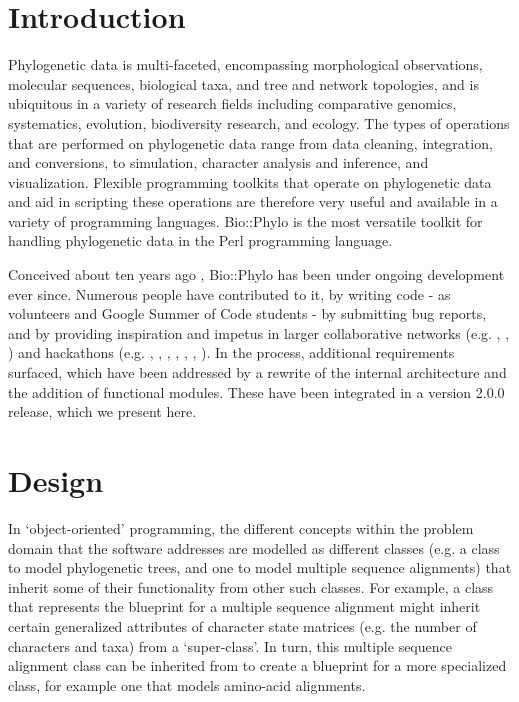\documentclass{bioinfo}
\begin{document}
\section{Introduction}

Phylogenetic data is multi-faceted, encompassing morphological observations, molecular 
sequences, biological taxa, and tree and network topologies, and is ubiquitous in a 
variety of research fields including comparative genomics, systematics, evolution, 
biodiversity research, and ecology. The types of operations that are performed on 
phylogenetic data range from data cleaning, integration, and conversions, to simulation,
character analysis and inference, and visualization. Flexible programming toolkits that
operate on phylogenetic data and aid in scripting these operations are therefore very 
useful and available in a variety of programming languages. Bio::Phylo \citep{Vos2011} is 
the most versatile toolkit for handling phylogenetic data in the Perl programming
language.

Conceived about ten years ago \citep{Vos2006,Vos2017}, Bio::Phylo has been under
ongoing development ever since. Numerous people have contributed to it, by writing code 
- as volunteers and Google Summer of Code students - by submitting bug reports, and by 
providing inspiration and impetus in larger collaborative networks (e.g. 
\citet{Stoltzfus2010}, \citet{Koureas2016}, \citet{Koureas2016a}) and hackathons (e.g. 
\citet{Lapp2007}, \citet{Katayama2010}, \citet{Katayama2011}, \citet{Katayama2013}, 
\citet{Stoltzfus2013}, \citet{Katayama2014}, \citet{Vos2014}). In the process, additional
requirements surfaced, which have been addressed by a rewrite of the internal architecture
and the addition of functional modules. These have been integrated in a version 2.0.0
release, which we present here.

\section{Design}

In `object-oriented' programming, the different concepts within the problem domain that
the software addresses are modelled as different classes (e.g. a class to model 
phylogenetic trees, and one to model multiple sequence alignments) that inherit some of 
their functionality from other such classes. For example, a class that represents the 
blueprint for a multiple sequence alignment might inherit certain generalized attributes 
of character state matrices (e.g. the number of characters and taxa) from a `super-class'. 
In turn, this multiple sequence alignment class can be inherited from to create a 
blueprint for a more specialized class, for example one that models amino-acid alignments. 
\end{document}
